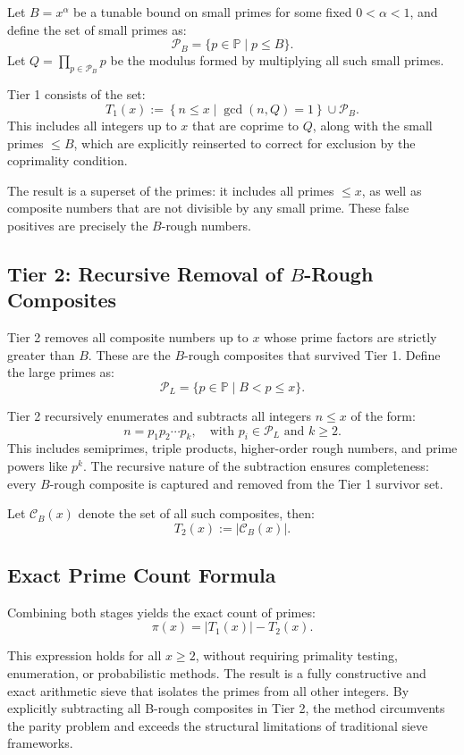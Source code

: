 \documentclass[11pt]{article}
\begin{document}
	Let \( B = x^\alpha \) be a tunable bound on small primes for some fixed \( 0 < \alpha < 1 \), and define the set of small primes as:
	\[
	\mathcal{P}_B = \{p \in \mathbb{P} \mid p \leq B\}.
	\]
	Let \( Q = \prod_{p \in \mathcal{P}_B} p \) be the modulus formed by multiplying all such small primes.
	
	Tier 1 consists of the set:
	\[
	T_1(x) := \left\{ n \leq x \mid \gcd(n, Q) = 1 \right\} \cup \mathcal{P}_B.
	\]
	This includes all integers up to \( x \) that are coprime to \( Q \), along with the small primes \( \leq B \), which are explicitly reinserted to correct for exclusion by the coprimality condition.
	
	The result is a superset of the primes: it includes all primes \( \leq x \), as well as composite numbers that are not divisible by any small prime. These false positives are precisely the \( B \)-rough numbers.
	
	\subsection{Tier 2: Recursive Removal of \texorpdfstring{$B$}{B}-Rough Composites}
	
	Tier 2 removes all composite numbers up to \( x \) whose prime factors are strictly greater than \( B \). These are the \( B \)-rough composites that survived Tier 1. Define the large primes as:
	\[
	\mathcal{P}_L = \{p \in \mathbb{P} \mid B < p \leq x\}.
	\]
	
	Tier 2 recursively enumerates and subtracts all integers \( n \leq x \) of the form:
	\[
	n = p_1 p_2 \cdots p_k, \quad \text{with } p_i \in \mathcal{P}_L \text{ and } k \geq 2.
	\]
	This includes semiprimes, triple products, higher-order rough numbers, and prime powers like \( p^k \). The recursive nature of the subtraction ensures completeness: every \( B \)-rough composite is captured and removed from the Tier 1 survivor set.
	
	Let \( \mathcal{C}_B(x) \) denote the set of all such composites, then:
	\[
	T_2(x) := |\mathcal{C}_B(x)|.
	\]
	
	\subsection{Exact Prime Count Formula}
	
	Combining both stages yields the exact count of primes:
	\[
	\pi(x) = |T_1(x)| - T_2(x).
	\]
	
	This expression holds for all \( x \geq 2 \), without requiring primality testing, enumeration, or probabilistic methods. The result is a fully constructive and exact arithmetic sieve that isolates the primes from all other integers. By explicitly subtracting all B-rough composites in Tier 2, the method circumvents the parity problem and exceeds the structural limitations of traditional sieve frameworks.
\end{document}
